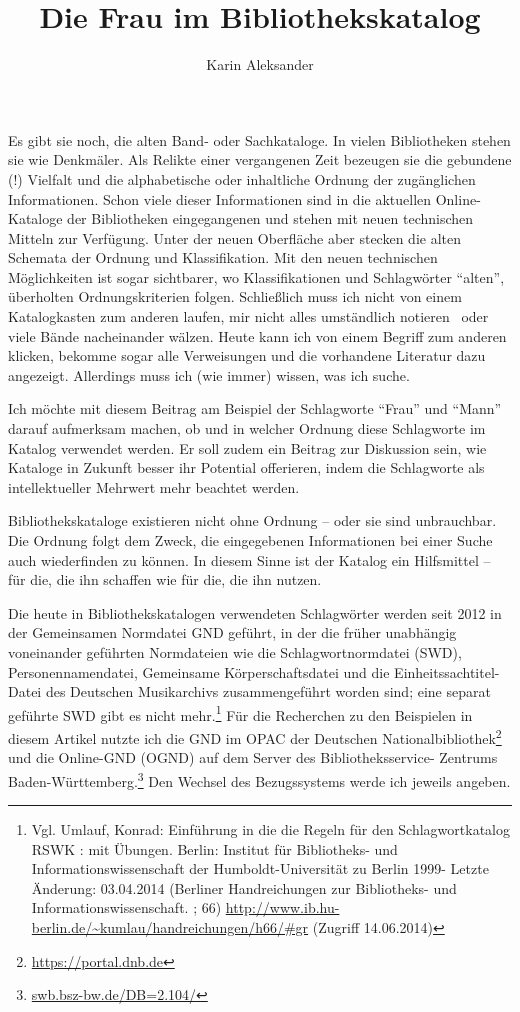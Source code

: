 \documentclass[a4paper,
fontsize=11pt,
oneside,
numbers=noperiodatend,
parskip=half-,
bibliography=totoc,
final
]{scrartcl}
\title{\LARGE{Die Frau im Bibliothekskatalog}} %
\author{Karin Aleksander} %
\date{}
\begin{document}
\maketitle
\thispagestyle{fancyplain} 


Es gibt sie noch, die alten Band- oder Sachkataloge. In vielen
Bibliotheken stehen sie wie Denk\-mäl\-er. Als Relikte einer vergangenen
Zeit bezeugen sie die gebundene (!) Vielfalt und die alphabetische oder
inhaltliche Ordnung der zugänglichen Informationen. Schon viele dieser
Informationen sind in die aktuellen Online-Kataloge der Bibliotheken
eingegangenen und stehen mit neuen technischen Mitteln zur Verfügung.
Unter der neuen Oberfläche aber stecken die alten Schemata der Ordnung
und Klassifikation. Mit den neuen technischen Möglichkeiten ist sogar
sichtbarer, wo Klassifikationen und Schlagwörter \enquote{alten},
überholten Ordnungskriterien folgen. Schließlich muss ich nicht von
einem Katalogkasten zum anderen laufen, mir nicht alles umständlich
notieren~ oder viele Bände nacheinander wälzen. Heute kann ich von einem
Begriff zum anderen klicken, bekomme sogar alle Verweisungen und die
vorhandene Literatur dazu angezeigt. Allerdings muss ich (wie immer)
wissen, was ich suche.~

Ich möchte mit diesem Beitrag am Beispiel der Schlagworte \enquote{Frau}
und \enquote{Mann} darauf aufmerksam machen, ob und in welcher Ordnung
diese Schlagworte im Katalog verwendet werden. Er soll zudem ein Beitrag
zur Diskussion sein, wie Kataloge in Zukunft besser ihr Potential
offerieren, indem die Schlagworte als intellektueller Mehrwert mehr
beachtet werden.

Bibliothekskataloge existieren nicht ohne Ordnung -- oder sie sind
unbrauchbar. Die Ordnung folgt dem Zweck, die eingegebenen Informationen
bei einer Suche auch wiederfinden zu können. In diesem Sinne ist der
Katalog ein Hilfsmittel -- für die, die ihn schaffen wie für die, die
ihn nutzen.

Die heute in Bibliothekskatalogen verwendeten Schlagwörter werden seit
2012 in der Gemeinsamen Normdatei GND geführt, in der die früher
unabhängig voneinander geführten Normdateien wie die Schlagwortnormdatei
(SWD), Personennamendatei, Gemeinsame Körperschaftsdatei und die
Einheitssachtitel-Datei des Deutschen Musikarchivs zusammengeführt
worden sind; eine separat geführte SWD gibt es nicht mehr.\footnote{Vgl.
  Umlauf, Konrad: Einführung in die die Regeln für den Schlagwortkatalog
  RSWK : mit Übungen. Berlin: Institut für Bibliotheks- und
  Informationswissenschaft der Humboldt-Universität zu Berlin 1999-
  Letzte Änderung: 03.04.2014 (Berliner Handreichungen zur Bibliotheks-
  und Informationswissenschaft. ; 66)
  \href{http://www.ib.hu-berlin.de/~kumlau/handreichungen/h66/xgr}{http://www.ib.hu-berlin.de/\textasciitilde{}kumlau/handreichungen/h66/\#gr}
  (Zugriff 14.06.2014)} Für die Recherchen zu den Beispielen in diesem
Artikel nutzte ich die GND im OPAC der Deutschen
Nationalbibliothek\footnote{\url{https://portal.dnb.de}} und die
Online-GND (OGND) auf dem Server des Bibliotheksservice- Zentrums
Baden-Württemberg.\footnote{\url{swb.bsz-bw.de/DB=2.104/}} Den Wechsel
des Bezugssystems werde ich jeweils angeben.
\end{document}
